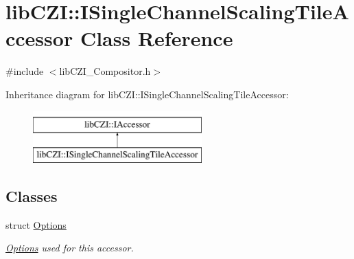 \hypertarget{classlib_c_z_i_1_1_i_single_channel_scaling_tile_accessor}{}\section{lib\+C\+ZI\+:\+:I\+Single\+Channel\+Scaling\+Tile\+Accessor Class Reference}
\label{classlib_c_z_i_1_1_i_single_channel_scaling_tile_accessor}


{\ttfamily \#include $<$lib\+C\+Z\+I\+\_\+\+Compositor.\+h$>$}

Inheritance diagram for lib\+C\+ZI\+:\+:I\+Single\+Channel\+Scaling\+Tile\+Accessor\+:\begin{figure}[H]
\begin{center}
\leavevmode
\includegraphics[height=2.000000cm]{classlib_c_z_i_1_1_i_single_channel_scaling_tile_accessor}
\end{center}
\end{figure}
\subsection*{Classes}
\begin{DoxyCompactItemize}
\item 
struct \hyperlink{structlib_c_z_i_1_1_i_single_channel_scaling_tile_accessor_1_1_options}{Options}
\begin{DoxyCompactList}\small\item\em \hyperlink{structlib_c_z_i_1_1_i_single_channel_scaling_tile_accessor_1_1_options}{Options} used for this accessor. \end{DoxyCompactList}\end{DoxyCompactItemize}
